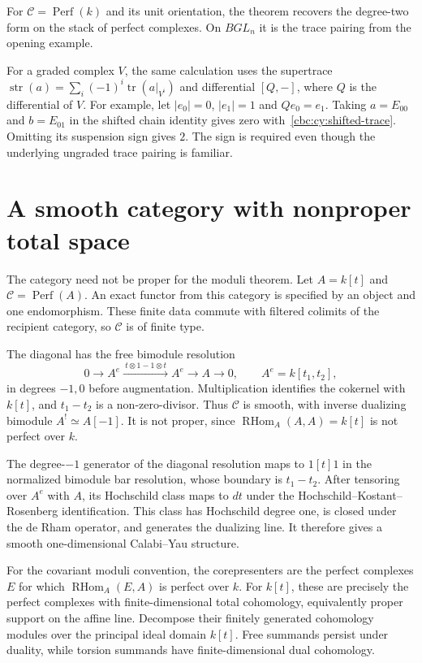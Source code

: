 For $\mathcal C=\operatorname{Perf}(k)$ and its unit orientation, the theorem recovers the degree-two form on the stack of perfect complexes.
On $BGL_n$ it is the trace pairing from the opening example.

For a graded complex $V$, the same calculation uses the supertrace
$\operatorname{str}(a)=\sum_i(-1)^i\operatorname{tr}(a|_{V^i})$ and differential $[Q,-]$, where $Q$ is the differential of $V$.
For example, let $|e_0|=0$, $|e_1|=1$ and $Qe_0=e_1$.
Taking $a=E_{00}$ and $b=E_{01}$ in the shifted chain identity gives zero with~\eqref{cbc:cy:shifted-trace}.
Omitting its suspension sign gives $2$.
The sign is required even though the underlying ungraded trace pairing is familiar.

\section{A smooth category with nonproper total space}

The category need not be proper for the moduli theorem.
Let $A=k[t]$ and $\mathcal C=\operatorname{Perf}(A)$.
An exact functor from this category is specified by an object and one endomorphism.
These finite data commute with filtered colimits of the recipient category, so $\mathcal C$ is of finite type.

The diagonal has the free bimodule resolution
\[
 0\longrightarrow A^e
   \xrightarrow{\ t\otimes1-1\otimes t\ }A^e
   \longrightarrow A\longrightarrow0,
 \qquad A^e=k[t_1,t_2],
\]
in degrees $-1,0$ before augmentation.
Multiplication identifies the cokernel with $k[t]$, and $t_1-t_2$ is a non-zero-divisor.
Thus $\mathcal C$ is smooth, with inverse dualizing bimodule $A^!\simeq A[-1]$.
It is not proper, since $\operatorname{RHom}_A(A,A)=k[t]$ is not perfect over $k$.

The degree-$-1$ generator of the diagonal resolution maps to $1[t]1$ in the normalized bimodule bar resolution, whose boundary is $t_1-t_2$.
After tensoring over $A^e$ with $A$, its Hochschild class maps to $dt$ under the Hochschild--Kostant--Rosenberg identification.
This class has Hochschild degree one, is closed under the de Rham operator, and generates the dualizing line.
It therefore gives a smooth one-dimensional Calabi--Yau structure.

For the covariant moduli convention, the corepresenters are the perfect complexes $E$ for which $\operatorname{RHom}_A(E,A)$ is perfect over $k$.
For $k[t]$, these are precisely the perfect complexes with finite-dimensional total cohomology, equivalently proper support on the affine line.
Decompose their finitely generated cohomology modules over the principal ideal domain $k[t]$.
Free summands persist under duality, while torsion summands have finite-dimensional dual cohomology.


